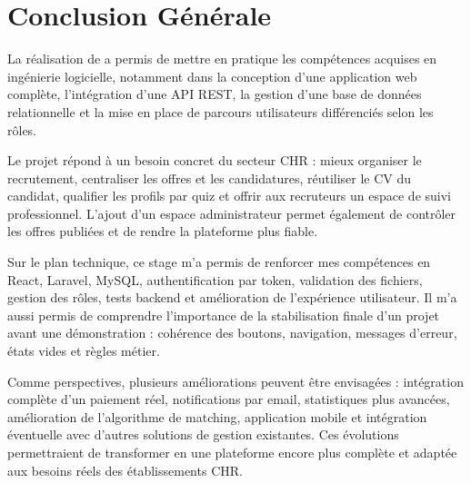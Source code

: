 \chapter*{Conclusion Générale}

\noindent
La réalisation de \projectName{} a permis de mettre en pratique les compétences acquises en ingénierie logicielle, notamment dans la conception d'une application web complète, l'intégration d'une API REST, la gestion d'une base de données relationnelle et la mise en place de parcours utilisateurs différenciés selon les rôles.

\noindent
Le projet répond à un besoin concret du secteur CHR : mieux organiser le recrutement, centraliser les offres et les candidatures, réutiliser le CV du candidat, qualifier les profils par quiz et offrir aux recruteurs un espace de suivi professionnel. L'ajout d'un espace administrateur permet également de contrôler les offres publiées et de rendre la plateforme plus fiable.

\noindent
Sur le plan technique, ce stage m'a permis de renforcer mes compétences en React, Laravel, MySQL, authentification par token, validation des fichiers, gestion des rôles, tests backend et amélioration de l'expérience utilisateur. Il m'a aussi permis de comprendre l'importance de la stabilisation finale d'un projet avant une démonstration : cohérence des boutons, navigation, messages d'erreur, états vides et règles métier.

\noindent
Comme perspectives, plusieurs améliorations peuvent être envisagées : intégration complète d'un paiement réel, notifications par email, statistiques plus avancées, amélioration de l'algorithme de matching, application mobile et intégration éventuelle avec d'autres solutions de gestion existantes. Ces évolutions permettraient de transformer \projectName{} en une plateforme encore plus complète et adaptée aux besoins réels des établissements CHR.
